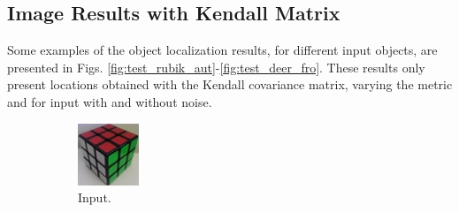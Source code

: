\documentclass[11pt]{article}
\theoremstyle{definition}
\theoremstyle{remark}
\theoremstyle{remark}
\theoremstyle{remark}
\begin{document}
\subsection{Image Results with Kendall Matrix}
Some examples of the object localization results, for different input objects, are presented in Figs. \ref{fig:test_rubik_aut}-\ref{fig:test_deer_fro}. These results only present locations obtained with the Kendall covariance matrix, varying the metric and for input with and without noise. 
\begin{figure}[H]
  \centering
  \begin{subfigure}[b]{0.32\textwidth}
    \centering
    \includegraphics[width=\textwidth]{figs/input2.jpg}
    \caption{Input.}
  \end{subfigure}
  \begin{subfigure}[b]{0.32\textwidth}
    \centering

\end{subfigure}
\end{figure}
\end{document}
